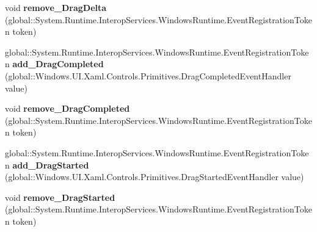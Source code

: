 \begin{DoxyCompactItemize}
\item 
\mbox{\label{interface_windows_1_1_u_i_1_1_xaml_1_1_controls_1_1_primitives_1_1_i_thumb_a7f2e0d4f77e1da383618536040a32d00}} 
void {\bfseries remove\+\_\+\+Drag\+Delta} (global\+::\+System.\+Runtime.\+Interop\+Services.\+Windows\+Runtime.\+Event\+Registration\+Token token)
\item 
\mbox{\label{interface_windows_1_1_u_i_1_1_xaml_1_1_controls_1_1_primitives_1_1_i_thumb_ad9d99e0f3518ed7231b6226b63c2d3e9}} 
global\+::\+System.\+Runtime.\+Interop\+Services.\+Windows\+Runtime.\+Event\+Registration\+Token {\bfseries add\+\_\+\+Drag\+Completed} (global\+::\+Windows.\+U\+I.\+Xaml.\+Controls.\+Primitives.\+Drag\+Completed\+Event\+Handler value)
\item 
\mbox{\label{interface_windows_1_1_u_i_1_1_xaml_1_1_controls_1_1_primitives_1_1_i_thumb_a9c342427ff81fa677a36391138856518}} 
void {\bfseries remove\+\_\+\+Drag\+Completed} (global\+::\+System.\+Runtime.\+Interop\+Services.\+Windows\+Runtime.\+Event\+Registration\+Token token)
\item 
\mbox{\label{interface_windows_1_1_u_i_1_1_xaml_1_1_controls_1_1_primitives_1_1_i_thumb_af16d7fcdb997b8237d826597ee4dfdf9}} 
global\+::\+System.\+Runtime.\+Interop\+Services.\+Windows\+Runtime.\+Event\+Registration\+Token {\bfseries add\+\_\+\+Drag\+Started} (global\+::\+Windows.\+U\+I.\+Xaml.\+Controls.\+Primitives.\+Drag\+Started\+Event\+Handler value)
\item 
\mbox{\label{interface_windows_1_1_u_i_1_1_xaml_1_1_controls_1_1_primitives_1_1_i_thumb_a160f1c382efe8c910b223fd4ae316948}} 
void {\bfseries remove\+\_\+\+Drag\+Started} (global\+::\+System.\+Runtime.\+Interop\+Services.\+Windows\+Runtime.\+Event\+Registration\+Token token)
\item 
\mbox{\label{interface_windows_1_1_u_i_1_1_xaml_1_1_controls_1_1_primitives_1_1_i_thumb_adb368ed2352b40482e7d4b409ff13165}} 

\end{DoxyCompactItemize}
